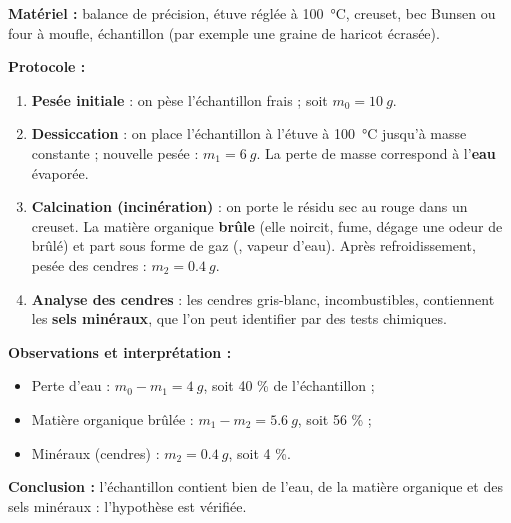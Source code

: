\documentclass[11pt]{article}
\begin{document}
\begin{experience}
\textbf{Matériel :} balance de précision, étuve réglée à \SI{100}{\celsius}, creuset, bec Bunsen ou four à moufle, échantillon (par exemple une graine de haricot écrasée).

\textbf{Protocole :}
\begin{enumerate}
\item \textbf{Pesée initiale} : on pèse l'échantillon frais ; soit $m_0 = \SI{10}{g}$.
\item \textbf{Dessiccation} : on place l'échantillon à l'étuve à \SI{100}{\celsius} jusqu'à masse constante ; nouvelle pesée : $m_1 = \SI{6}{g}$. La perte de masse correspond à l'\textbf{eau} évaporée.
\item \textbf{Calcination (incinération)} : on porte le résidu sec au rouge dans un creuset. La matière organique \textbf{brûle} (elle noircit, fume, dégage une odeur de brûlé) et part sous forme de gaz (, vapeur d'eau). Après refroidissement, pesée des cendres : $m_2 = \SI{0,4}{g}$.
\item \textbf{Analyse des cendres} : les cendres gris-blanc, incombustibles, contiennent les \textbf{sels minéraux}, que l'on peut identifier par des tests chimiques.
\end{enumerate}

\textbf{Observations et interprétation :}
\begin{itemize}
\item Perte d'eau : $m_0 - m_1 = \SI{4}{g}$, soit 40 \% de l'échantillon ;
\item Matière organique brûlée : $m_1 - m_2 = \SI{5,6}{g}$, soit 56 \% ;
\item Minéraux (cendres) : $m_2 = \SI{0,4}{g}$, soit 4 \%.
\end{itemize}

\textbf{Conclusion :} l'échantillon contient bien de l'eau, de la matière organique et des sels minéraux : l'hypothèse est vérifiée.
\end{experience}
\end{document}

